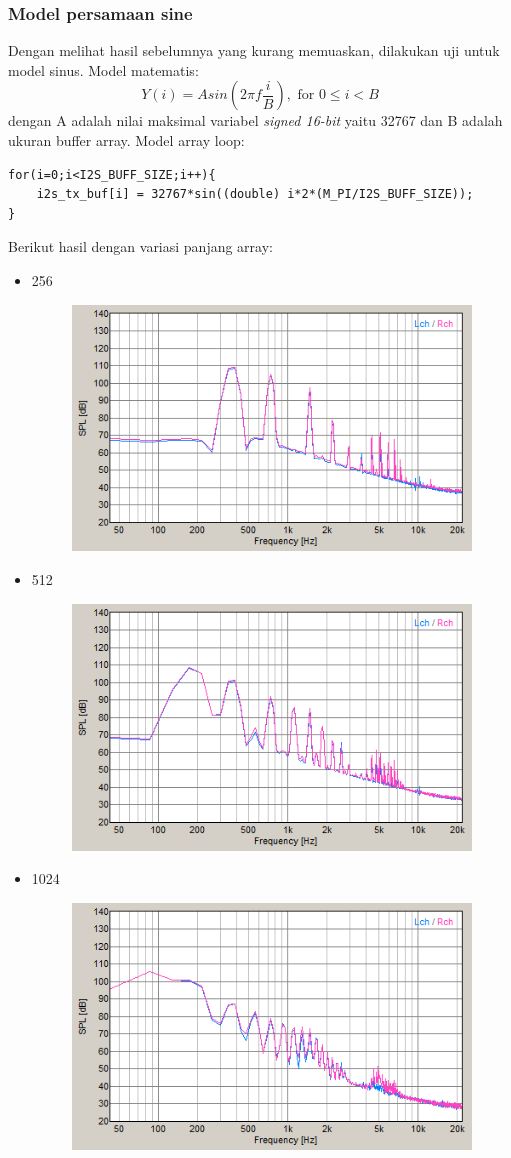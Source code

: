 \documentclass[12pt,]{article}
\begin{document}
 	 \newpage
 	 \subsubsection{Model persamaan sine}
 	 Dengan melihat hasil sebelumnya yang kurang memuaskan, dilakukan uji untuk model sinus.
 	 Model matematis:
 	 \[ Y(i) = A sin(2\pi f \frac{i}{B}), \text{ for } 0 \leq i < B \] 
 	 dengan A adalah nilai maksimal variabel \textit{signed 16-bit} yaitu 32767
 	 dan B adalah ukuran buffer array.
 	 Model array loop:
 	 \begin{verbatim}
for(i=0;i<I2S_BUFF_SIZE;i++){
	i2s_tx_buf[i] = 32767*sin((double) i*2*(M_PI/I2S_BUFF_SIZE));
}
 	 \end{verbatim}
 	 Berikut hasil dengan variasi panjang array:
 	 \begin{itemize}
 	 	\item 256
 	 	\begin{figure}[H]
 	 		\centering
 	 		\includegraphics[width=0.45\linewidth]{result/day_1/max256}
 	 	\end{figure}
  	
  		\item 512
  		\begin{figure}[H]
  			\centering
  			\includegraphics[width=0.45\linewidth]{result/day_1/max512}
  		\end{figure}
  	
  		\item 1024
  		\begin{figure}[H]
  			\centering
  			\includegraphics[width=0.45\linewidth]{result/day_1/max1024}
  		\end{figure}
 	 \end{itemize} 
  
\end{document}
